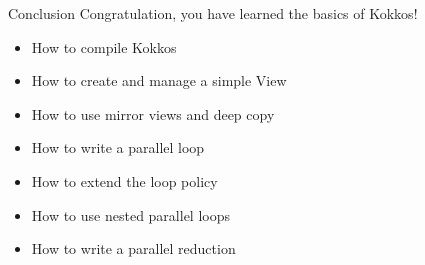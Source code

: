 \documentclass[aspectratio=169]{beamer}
\begin{document}
\begin{frame}{Conclusion}
    Congratulation, you have learned the basics of Kokkos!

    \begin{itemize}
        \item How to compile Kokkos
        \item How to create and manage a simple View
        \item How to use mirror views and deep copy
        \item How to write a parallel loop
        \item How to extend the loop policy
        \item How to use nested parallel loops
        \item How to write a parallel reduction
    \end{itemize}
\end{frame}
\end{document}
